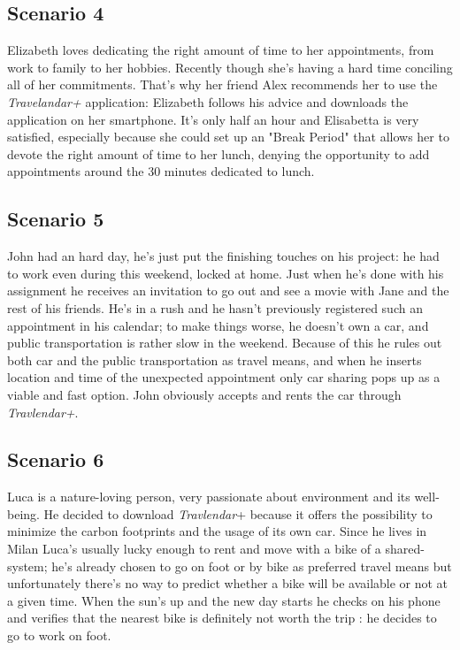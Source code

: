 \subsection{Scenario 4}

Elizabeth loves dedicating the right amount of time to her appointments, from work to family to her hobbies. Recently though she’s having a hard time conciling all of her commitments.
That’s why her friend Alex recommends her to use the \textit{Travelandar+} application: Elizabeth follows his advice and downloads the application on her smartphone.
It’s only half an hour and Elisabetta is very satisfied, especially because she could set up an "Break Period" that allows her to devote the right amount of time to her lunch, denying the opportunity to add appointments around the 30 minutes dedicated to lunch.

\subsection {Scenario 5}

John had an hard day, he’s just put the finishing touches on his project: he had to work even during this weekend, locked at home. Just when he’s done with his assignment he receives an invitation to go out and see a movie with Jane and the rest of his friends.
He’s in a rush and he hasn’t previously registered such an appointment in his calendar; to make things worse, he doesn’t own a car, and public transportation is rather slow in the weekend.
Because of this he rules out both car and the public transportation as travel means, and when he inserts location and time of the unexpected appointment only car sharing pops up as a viable and fast option.
John obviously accepts and rents the car through \textit{Travlendar+}.

\subsection {Scenario 6}

Luca is a nature-loving person, very passionate about environment and its well-being.
He decided to download \textit{Travlendar}+ because it offers the possibility to minimize the carbon footprints and the usage of its own car.
Since he lives in Milan Luca’s usually lucky enough to rent and move with a bike of a shared-system; he’s already chosen to go on foot or by bike as preferred travel means but unfortunately there’s no way to predict whether a bike will be available or not at a given time.
When the sun’s up and the new day starts he checks on his phone and verifies that the nearest bike is definitely not worth the trip : he decides to go to work on foot.


